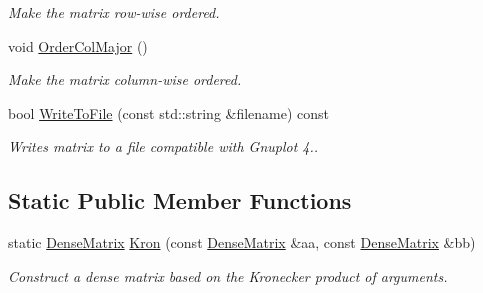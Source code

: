 \begin{DoxyCompactItemize}
\begin{DoxyCompactList}\small\item\em Make the matrix row-\/wise ordered. \end{DoxyCompactList}\item 
void \hyperlink{classmtk_1_1DenseMatrix_a59b9bea24acf39dca64e8549b3527463}{Order\+Col\+Major} ()
\begin{DoxyCompactList}\small\item\em Make the matrix column-\/wise ordered. \end{DoxyCompactList}\item 
bool \hyperlink{classmtk_1_1DenseMatrix_ab396804fb5f188e1eaa8578c738c59fc}{Write\+To\+File} (const std\+::string \&filename) const 
\begin{DoxyCompactList}\small\item\em Writes matrix to a file compatible with Gnuplot 4.. \end{DoxyCompactList}\end{DoxyCompactItemize}
\subsection*{Static Public Member Functions}
\begin{DoxyCompactItemize}
\item 
static \hyperlink{classmtk_1_1DenseMatrix}{Dense\+Matrix} \hyperlink{classmtk_1_1DenseMatrix_a01d3d8bd502870f93bf3a88a0cc5fb49}{Kron} (const \hyperlink{classmtk_1_1DenseMatrix}{Dense\+Matrix} \&aa, const \hyperlink{classmtk_1_1DenseMatrix}{Dense\+Matrix} \&bb)
\begin{DoxyCompactList}\small\item\em Construct a dense matrix based on the Kronecker product of arguments. \end{DoxyCompactList}\end{DoxyCompactItemize}
